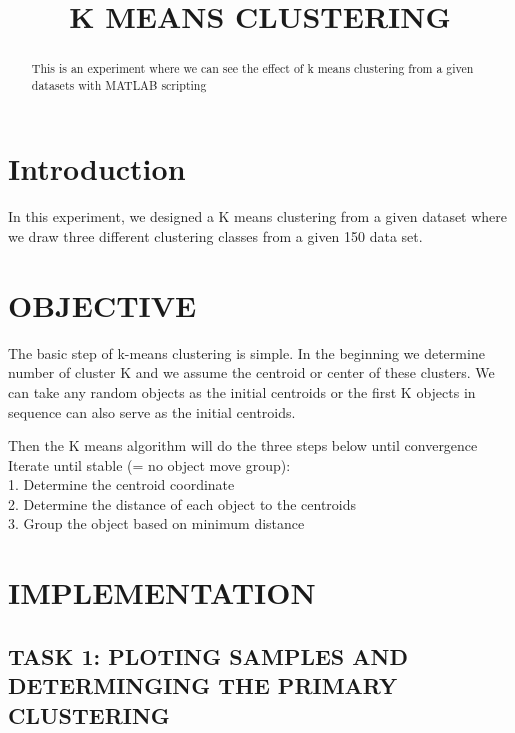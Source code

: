 \documentclass[conference]{IEEEtran}
\begin{document}
\title{K MEANS CLUSTERING}

\author{
}

\maketitle
\begin{abstract}
This is an experiment where we can see the effect of k means clustering from a given datasets with MATLAB scripting
\end{abstract}
\IEEEpeerreviewmaketitle

\section{Introduction}
In this experiment, we designed a K means clustering from a given dataset where we draw three different clustering classes from a given 150 data set.

\section{OBJECTIVE}
The basic step of k-means clustering is simple. In the beginning we determine number of cluster K and we assume the centroid or center of these clusters. We can take any random objects as the initial centroids or the first K objects in sequence can also serve as the initial centroids.

Then the K means algorithm will do the three steps below until convergence Iterate until stable (= no object move group): \\

1. Determine the centroid coordinate \\
2. Determine the distance of each object to the centroids\\
3. Group the object based on minimum distance\\


\section{IMPLEMENTATION}
\subsection{TASK 1: PLOTING SAMPLES AND DETERMINGING THE PRIMARY CLUSTERING}
\end{document}
